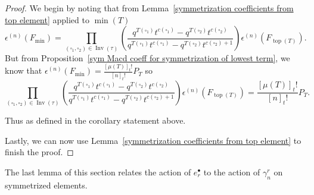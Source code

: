 \documentclass[pdftex]{sigma}
\numberwithin{equation}{section}
\theoremstyle{definition}
\DeclareMathOperator{\Inv}{\mathrm{Inv}}
\DeclareMathOperator{\Top}{\mathrm{top}}
\DeclareMathOperator{\Min}{\mathrm{min}}
\begin{document}
\begin{proof}
 We begin by noting that from Lemma~\ref{symmetrization coefficients from top element} applied to $\Min(T)$
 \[
 \epsilon^{(n)}(F_{\Min}) = \prod_{(\square_1,\square_2) \in \Inv(\tau)} \left( \frac{q^{T(\square_1)}t^{c(\square_1)} - q^{T(\square_2)}t^{c(\square_2) }}{q^{T(\square_1)}t^{c(\square_1)} - q^{T(\square_2)}t^{c(\square_2) +1}} \right) \epsilon^{(n)}(F_{\Top(T)}).
 \]
 But from Proposition~\ref{sym Macd coeff for symmetrization of lowest term}, we know that $\epsilon^{(n)}(F_{\Min}) = \frac{[\mu(T)]_{t}!}{[n]_{t}!} P_T$ so
 \[
 \prod_{(\square_1,\square_2) \in \Inv(\tau)} \left( \frac{q^{T(\square_1)}t^{c(\square_1)} - q^{T(\square_2)}t^{c(\square_2) }}{q^{T(\square_1)}t^{c(\square_1)} - q^{T(\square_2)}t^{c(\square_2) +1}} \right) \epsilon^{(n)}(F_{\Top(T)}) = \frac{[\mu(T)]_{t}!}{[n]_{t}!} P_T.
 \]

 Thus
\smash{$
 \epsilon^{(n)}(F_{\Top(T)}) = K_T(q,t) P_T
$}
 as defined in the corollary statement above.

 Lastly, we can now use Lemma~\ref{symmetrization coefficients from top element} to finish the proof.
\end{proof}

The last lemma of this section relates the action of $e_r^{\bullet}$ to the action of $\gamma_n^{r}$ on symmetrized elements.
\end{document}

